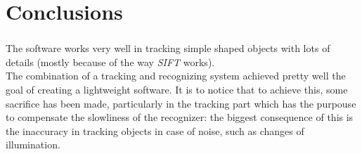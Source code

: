 \documentclass{beamer}
\begin{document}
  \section{Conclusions}

  \begin{frame}
    \frametitle{\insertsection}
    The software works very well in tracking simple shaped objects with lots of
    details (mostly because of the way \emph{SIFT} works).\\
    The combination of a tracking and recognizing system achieved pretty well
    the goal of creating a lightweight software.
    It is to notice that to achieve this, some sacrifice has been made,
    particularly in the tracking part which has the purpouse to compensate
    the slowliness of the recognizer: the biggest consequence of this is
    the inaccuracy in tracking objects in case of noise, such as changes of
    illumination.\\
  \end{frame}
\end{document}
